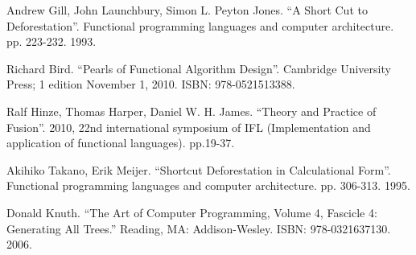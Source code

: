 \documentclass[b5paper]{ctexart}
\begin{document}
\begin{thebibliography}{99}

Andrew Gill, John Launchbury, Simon L. Peyton Jones. ``A Short Cut to Deforestation''. Functional programming languages and computer architecture. pp. 223-232. 1993.

Richard Bird. ``Pearls of Functional Algorithm Design''. Cambridge University Press; 1 edition November 1, 2010. ISBN: 978-0521513388.

Ralf Hinze, Thomas Harper, Daniel W. H. James. ``Theory and Practice of Fusion''. 2010, 22nd international symposium of IFL (Implementation and application of functional languages). pp.19-37.

Akihiko Takano, Erik Meijer. ``Shortcut Deforestation in Calculational Form''. Functional programming languages and computer architecture. pp. 306-313. 1995.

Donald Knuth. ``The Art of Computer Programming, Volume 4, Fascicle 4: Generating All Trees.'' Reading, MA: Addison-Wesley. ISBN: 978-0321637130. 2006.

\end{thebibliography}

\expandafter\enddocument

\fi
\end{document}
